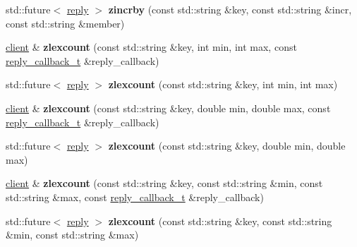 \begin{DoxyCompactItemize}
std\+::future$<$ \hyperlink{classcpp__redis_1_1reply}{reply} $>$ {\bfseries zincrby} (const std\+::string \&key, const std\+::string \&incr, const std\+::string \&member)
\item 
\mbox{\label{classcpp__redis_1_1client_ad4a8fef29a047724ad4e97eedfb53c62}} 
\hyperlink{classcpp__redis_1_1client}{client} \& {\bfseries zlexcount} (const std\+::string \&key, int min, int max, const \hyperlink{classcpp__redis_1_1client_a061a1140d36d2eaeda82b09a0bb3f9f2}{reply\+\_\+callback\+\_\+t} \&reply\+\_\+callback)
\item 
\mbox{\label{classcpp__redis_1_1client_aff60a1181d93d961f6ca1903522ce899}} 
std\+::future$<$ \hyperlink{classcpp__redis_1_1reply}{reply} $>$ {\bfseries zlexcount} (const std\+::string \&key, int min, int max)
\item 
\mbox{\label{classcpp__redis_1_1client_aba1b2a6c750b13b1a632ebc8ca90cf60}} 
\hyperlink{classcpp__redis_1_1client}{client} \& {\bfseries zlexcount} (const std\+::string \&key, double min, double max, const \hyperlink{classcpp__redis_1_1client_a061a1140d36d2eaeda82b09a0bb3f9f2}{reply\+\_\+callback\+\_\+t} \&reply\+\_\+callback)
\item 
\mbox{\label{classcpp__redis_1_1client_ab492b901c49f913d0120b87afee9458c}} 
std\+::future$<$ \hyperlink{classcpp__redis_1_1reply}{reply} $>$ {\bfseries zlexcount} (const std\+::string \&key, double min, double max)
\item 
\mbox{\label{classcpp__redis_1_1client_a90bd86c8348ca8bfec29d66d9e5bdfc3}} 
\hyperlink{classcpp__redis_1_1client}{client} \& {\bfseries zlexcount} (const std\+::string \&key, const std\+::string \&min, const std\+::string \&max, const \hyperlink{classcpp__redis_1_1client_a061a1140d36d2eaeda82b09a0bb3f9f2}{reply\+\_\+callback\+\_\+t} \&reply\+\_\+callback)
\item 
\mbox{\label{classcpp__redis_1_1client_ace7bbf92a0ea2cac775e5bc66a0d1ea8}} 
std\+::future$<$ \hyperlink{classcpp__redis_1_1reply}{reply} $>$ {\bfseries zlexcount} (const std\+::string \&key, const std\+::string \&min, const std\+::string \&max)
\item 

\end{DoxyCompactItemize}

